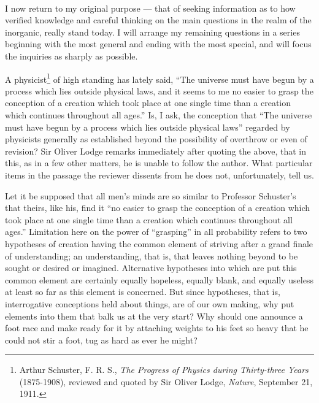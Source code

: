 \documentclass[a4paper, 11pt, oneside, polutonikogreek, english, landscape]{article}
\begin{document}
\paragraph{}
I now return to my original purpose --- that of seeking information as to how verified knowledge and careful thinking on the main questions in the realm of the inorganic, really stand today. I will arrange my remaining questions in a series beginning with the most general and ending with the most special, and will focus the inquiries as sharply as possible.

A physicist\footnote{Arthur Schuster, F. R. S., \emph{The Progress of Physics during Thirty-three Years} (1875-1908), reviewed and quoted by Sir Oliver Lodge, \emph{Nature}, September 21, 1911.} of high standing has lately said, ``The universe must have begun by a process which lies outside physical laws, and it seems to me no easier to grasp the conception of a creation which took place at one single time than a creation which continues throughout all ages.'' Is, I ask, the conception that ``The universe must have begun by a process which lies outside physical laws'' regarded by physicists generally as established beyond the possibility of overthrow or even of revision? Sir Oliver Lodge remarks immediately after quoting the above, that in this, as in a few other matters, he is unable to follow the author. What particular items in the passage the reviewer dissents from he does not, unfortunately, tell us.

Let it be supposed that all men's minds are so similar to Professor Schuster's that theirs, like his, find it ``no easier to grasp the conception of a creation which took place at one single time than a creation which continues throughout all ages.'' Limitation here on the power of ``grasping'' in all probability refers to two hypotheses of creation having the common element of striving after a grand finale of understanding; an understanding, that is, that leaves nothing beyond to be sought or desired or imagined. Alternative hypotheses into which are put this common element are certainly equally hopeless, equally blank, and equally useless at least so far as this element is concerned. But since hypotheses, that is, interrogative conceptions held about things, are of our own making, why put elements into them that balk us at the very start? Why should one announce a foot race and make ready for it by attaching weights to his feet so heavy that he could not stir a foot, tug as hard as ever he might?
\end{document}
